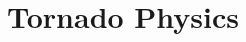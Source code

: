 \documentclass[10pt,a4j,openany,dvipdfmx]{jsarticle}
\begin{document}
\section{Tornado Physics} %
\label{sec:Tornado Physics}



\end{document}
